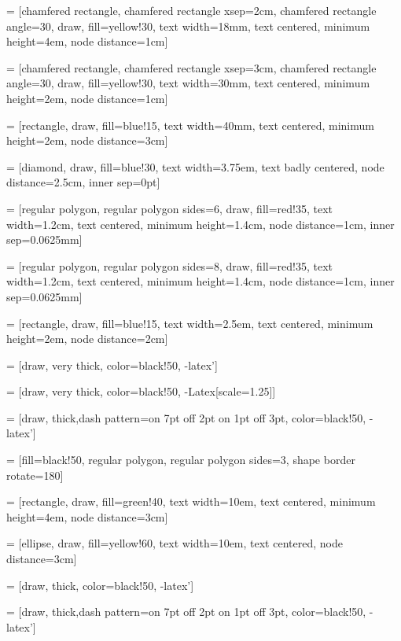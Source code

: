  = [chamfered rectangle, chamfered rectangle xsep=2cm, chamfered rectangle angle=30, draw, fill=yellow!30, text width=18mm, text centered, minimum height=4em, node distance=1cm]

 = [chamfered rectangle, chamfered rectangle xsep=3cm, chamfered rectangle angle=30, draw, fill=yellow!30, text width=30mm, text centered, minimum height=2em, node distance=1cm]


 = [rectangle, draw, fill=blue!15, text width=40mm, text centered, minimum height=2em, node distance=3cm]

 = [diamond, draw, fill=blue!30, text width=3.75em, text badly centered, node distance=2.5cm, inner sep=0pt]

 = [regular polygon, regular polygon sides=6, draw, fill=red!35, text width=1.2cm, text centered, minimum height=1.4cm, node distance=1cm, inner sep=0.0625mm]

 = [regular polygon, regular polygon sides=8, draw, fill=red!35, text width=1.2cm, text centered, minimum height=1.4cm, node distance=1cm, inner sep=0.0625mm]

 = [rectangle, draw, fill=blue!15, text width=2.5em, text centered, minimum height=2em, node distance=2cm]

 = [draw, very thick, color=black!50, -latex']

 = [draw, very thick, color=black!50, -{Latex[scale=1.25]}]

 = [draw, thick,dash pattern={on 7pt off 2pt on 1pt off 3pt}, color=black!50, -latex']

 = [fill=black!50, regular polygon, regular polygon sides=3, shape border rotate=180]

 = [rectangle, draw, fill=green!40, text width=10em, text centered, minimum height=4em, node distance=3cm]

 = [ellipse, draw, fill=yellow!60, text width=10em, text centered, node distance=3cm]

 = [draw, thick, color=black!50, -latex']

 = [draw, thick,dash pattern={on 7pt off 2pt on 1pt off 3pt}, color=black!50, -latex']
